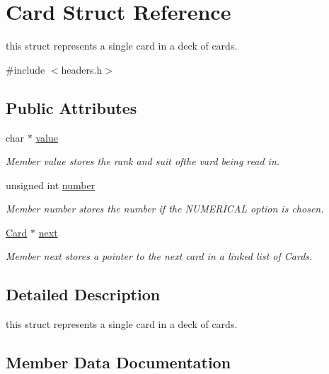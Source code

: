 \hypertarget{structCard}{}\section{Card Struct Reference}
\label{structCard}


this struct represents a single card in a deck of cards.  




{\ttfamily \#include $<$headers.\+h$>$}

\subsection*{Public Attributes}
\begin{DoxyCompactItemize}
\item 
char $\ast$ \mbox{\hyperlink{structCard_a2d649d6bb946578a3677f8919a887dec}{value}}
\begin{DoxyCompactList}\small\item\em Member value stores the rank and suit ofthe vard being read in. \end{DoxyCompactList}\item 
unsigned int \mbox{\hyperlink{structCard_a8f209bb3a4387d6904a5f2187b5f1c65}{number}}
\begin{DoxyCompactList}\small\item\em Member \textquotesingle{}number\textquotesingle{} stores the number if the N\+U\+M\+E\+R\+I\+C\+AL option is chosen. \end{DoxyCompactList}\item 
\mbox{\hyperlink{structCard}{Card}} $\ast$ \mbox{\hyperlink{structCard_a5420b66c533f4e865e0159614d61d01e}{next}}
\begin{DoxyCompactList}\small\item\em Member \textquotesingle{}next\textquotesingle{} stores a pointer to the next card in a linked list of Cards. \end{DoxyCompactList}\end{DoxyCompactItemize}


\subsection{Detailed Description}
this struct represents a single card in a deck of cards. 

\subsection{Member Data Documentation}
\mbox{\label{structCard_a5420b66c533f4e865e0159614d61d01e}} 
